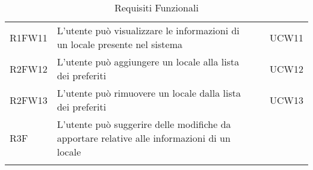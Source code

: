 \begin{longtable}{ m{}<{\centering}  m{}<{\centering}  m{}<{\centering}  m{}<{\centering}}
	R1FW11 & L’utente può visualizzare le informazioni di un locale presente nel sistema & \Ob & UCW11\\	 	 	 	

	R2FW12 & L’utente può aggiungere un locale alla lista dei preferiti & \De &  UCW12\\

	R2FW13 & L’utente può rimuovere un locale dalla lista dei preferiti & \De & UCW13\\

	R3F & L’utente può suggerire delle modifiche da apportare relative alle informazioni di un locale & \Fa & \Di \\

	\caption{Requisiti Funzionali}
\end{longtable}

\clearpage